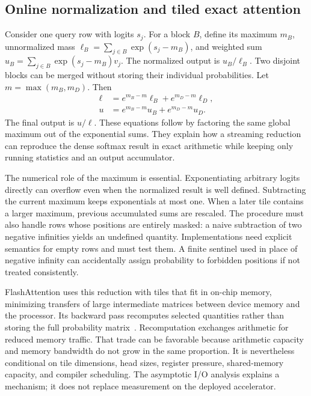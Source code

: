 \subsection{Online normalization and tiled exact attention}
\label{sec:C04:online}
Consider one query row with logits $s_j$. For a block $B$, define its maximum $m_B$, unnormalized mass $\ell_B=\sum_{j\in B}\exp(s_j-m_B)$, and weighted sum $u_B=\sum_{j\in B}\exp(s_j-m_B)v_j$. The normalized output is $u_B/\ell_B$. Two disjoint blocks can be merged without storing their individual probabilities. Let $m=\max(m_B,m_D)$. Then
\begin{equation}
\begin{aligned}
 \ell&=e^{m_B-m}\ell_B+e^{m_D-m}\ell_D,\\
 u&=e^{m_B-m}u_B+e^{m_D-m}u_D.
\end{aligned}
\end{equation}
The final output is $u/\ell$. These equations follow by factoring the same global maximum out of the exponential sums. They explain how a streaming reduction can reproduce the dense softmax result in exact arithmetic while keeping only running statistics and an output accumulator.

The numerical role of the maximum is essential. Exponentiating arbitrary logits directly can overflow even when the normalized result is well defined. Subtracting the current maximum keeps exponentials at most one. When a later tile contains a larger maximum, previous accumulated sums are rescaled. The procedure must also handle rows whose positions are entirely masked: a naive subtraction of two negative infinities yields an undefined quantity. Implementations need explicit semantics for empty rows and must test them. A finite sentinel used in place of negative infinity can accidentally assign probability to forbidden positions if not treated consistently.

FlashAttention uses this reduction with tiles that fit in on-chip memory, minimizing transfers of large intermediate matrices between device memory and the processor. Its backward pass recomputes selected quantities rather than storing the full probability matrix~\cite{dao2022flashattention}. Recomputation exchanges arithmetic for reduced memory traffic. That trade can be favorable because arithmetic capacity and memory bandwidth do not grow in the same proportion. It is nevertheless conditional on tile dimensions, head sizes, register pressure, shared-memory capacity, and compiler scheduling. The asymptotic I/O analysis explains a mechanism; it does not replace measurement on the deployed accelerator.

